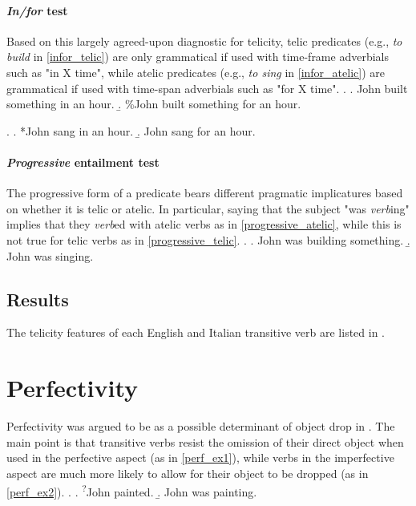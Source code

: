 \paragraph{\textit{In/for} test} Based on this largely agreed-upon diagnostic for telicity, telic predicates (e.g., \textit{to build} in \ref{infor_telic}) are only grammatical if used with time-frame adverbials such as "in X time", while atelic predicates (e.g., \textit{to sing} in \ref{infor_atelic}) are grammatical if used with time-span adverbials such as "for X time".
\ex. \label{infor_telic} \a. John built something in an hour.
\b. \%John built something for an hour.

\ex. \label{infor_atelic} \a. *John sang in an hour.
\b. John sang for an hour.

\paragraph{\textit{Progressive} entailment test} The progressive form of a predicate bears different pragmatic implicatures based on whether it is telic or atelic. In particular, saying that the subject "was \textit{verb}ing" implies that they \textit{verb}ed with atelic verbs as in \ref{progressive_atelic}, while this is not true for telic verbs as in \ref{progressive_telic}.
\ex. \a. John was building something. \label{progressive_telic} 
\b. John was singing. \label{progressive_atelic}

\subsection{Results}
The telicity features of each English and Italian transitive verb are listed in .



\section{Perfectivity} 

Perfectivity was argued to be as a possible determinant of object drop in . The main point is that transitive verbs resist the omission of their direct object when used in the perfective aspect (as in \ref{perf_ex1}), while verbs in the imperfective aspect are much more likely to allow for their object to be dropped (as in \ref{perf_ex2}).
\ex.\label{perf_ex} \a. \textsuperscript{?}John painted. \label{perf_ex1} 
\b. John was painting. \label{perf_ex2}

